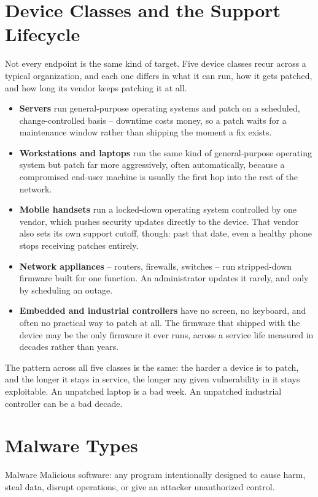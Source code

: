 \section{Device Classes and the Support Lifecycle}

Not every endpoint is the same kind of target. Five device classes recur across a typical
organization, and each one differs in what it can run, how it gets patched, and how long its
vendor keeps patching it at all.

\begin{itemize}
\item \textbf{Servers} run general-purpose operating systems and patch on a scheduled,
change-controlled basis -- downtime costs money, so a patch waits for a maintenance window rather
than shipping the moment a fix exists.
\item \textbf{Workstations and laptops} run the same kind of general-purpose operating system but
patch far more aggressively, often automatically, because a compromised end-user machine is
usually the first hop into the rest of the network.
\item \textbf{Mobile handsets} run a locked-down operating system controlled by one vendor, which
pushes security updates directly to the device. That vendor also sets its own support cutoff,
though: past that date, even a healthy phone stops receiving patches entirely.
\item \textbf{Network appliances} -- routers, firewalls, switches -- run stripped-down firmware
built for one function. An administrator updates it rarely, and only by scheduling an outage.
\item \textbf{Embedded and industrial controllers} have no screen, no keyboard, and often no
practical way to patch at all. The firmware that shipped with the device may be the only firmware
it ever runs, across a service life measured in decades rather than years.
\end{itemize}

The pattern across all five classes is the same: the harder a device is to patch, and the longer
it stays in service, the longer any given vulnerability in it stays exploitable. An unpatched
laptop is a bad week. An unpatched industrial controller can be a bad decade.

\section{Malware Types}

\begin{definition}{Malware}
Malicious software: any program intentionally designed to cause harm, steal data, disrupt
operations, or give an attacker unauthorized control.
\end{definition}

